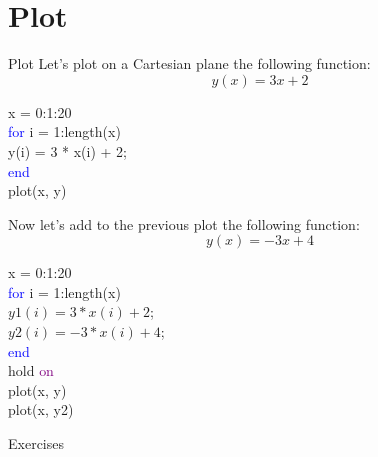 \documentclass[xcolor={dvipsnames,rgb}, aspectratio=169]{beamer}
\begin{document}
\section{Plot}
\begin{frame}{Plot}
Let's plot on a Cartesian plane the following function:
\begin{equation*}
    y(x) = 3x + 2
\end{equation*}
\begin{tcolorbox}[colback=white,colframe=bluepoli]
   x = 0:1:20\\
   \textcolor{blue}{for} i = 1:length(x)\\
   \hspace{1em} y(i) = 3 * x(i) + 2; \\
   \textcolor{blue}{end}\\
   plot(x, y)
\end{tcolorbox}
\end{frame}

\begin{frame}{}
Now let's add to the previous plot the following function:
\begin{equation*}
   y(x) = -3x + 4
\end{equation*}

\begin{tcolorbox}[colback=white,colframe=bluepoli]
   x = 0:1:20\\
   \textcolor{blue}{for} i = 1:length(x)\\
      $y1(i) = 3 * x(i) + 2$; \\
      $y2(i) = -3 * x(i) + 4$; \\
   \textcolor{blue}{end}\\
   hold \textcolor{purple}{on}\\
   plot(x, y) \\
   plot(x, y2)
\end{tcolorbox}
\end{frame}

{%
\begin{frame}[standout]
   Exercises
\end{frame}
}
\end{document}
